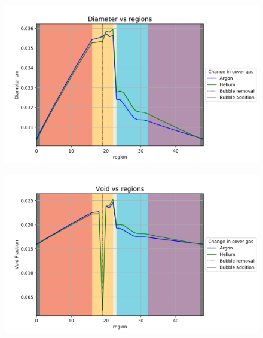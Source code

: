 \begin{figure}[p] 
\centering
\begin{minipage}{.5\textwidth}
  \centering
  \includegraphics[width=1.0\linewidth]{images/CoverGasDiameter.png}
  \label{fig:CoverGasDia}
\end{minipage}%
\begin{minipage}{.5\textwidth}
  \centering
  \includegraphics[width=1.0\linewidth]{images/CoverGasVoid.png}
  \label{fig:CoverGasVoid}
\end{minipage}
\end{figure}

